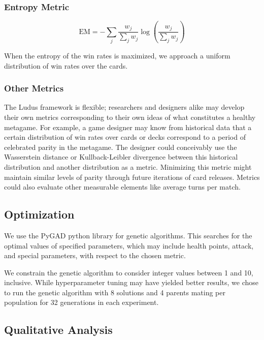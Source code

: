 \subsubsection{Entropy Metric}

\begin{equation}
	\mathrm{EM} = -\sum_j \frac{w_j}{\sum_j w_j} \log\left(\frac{w_j}{\sum_j w_j}\right)
\end{equation}

When the entropy of the win rates is maximized, we approach a uniform
distribution of win rates over the cards.

\subsubsection{Other Metrics} \label{sec:othermetrics}

The {\sc Ludus} framework is flexible; researchers and designers alike may develop their own metrics corresponding to their
own ideas of what constitutes a healthy metagame. For example, a game designer may know from historical data that
a certain distribution of win rates over cards or decks correspond to a period of celebrated parity in the metagame. 
The designer could conceivably use the Wasserstein distance or Kullback-Leibler 
divergence between this historical distribution and another distribution as a metric. Minimizing this metric 
might maintain similar levels of parity through future iterations of card releases.
Metrics could also evaluate other measurable elements like average turns per match.

\subsection{Optimization} \label{sec:optimization}

We use the PyGAD python library \cite{gad2021pygad} for genetic %
algorithms. This searches for the optimal values of
specified parameters, which may include health points, attack, and special parameters, with respect to %
the chosen metric.

We constrain the genetic algorithm to consider integer values between 1 and 10, inclusive. While hyperparameter tuning may have yielded better results,
we chose to run the genetic algorithm with 8 solutions and 4 parents mating per population for 32 generations in each experiment.

\subsection{Qualitative Analysis} \label{sec:qualitative-analysis}

